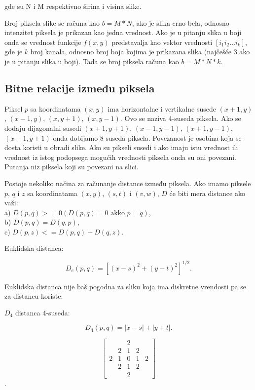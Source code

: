 \documentclass[a4paper,12pt,titlepage]{article}
\begin{document}
gde su N i M respektivno širina i visina slike.

Broj piksela slike se računa kao $b = M * N$, ako je slika crno bela, odnosno intenzitet piksela je prikazan kao jedna vrednost. Ako je u pitanju slika u boji onda se vrednost funkcije $f(x, y)$ predstavalja kao vektor vrednosti $[i_{1} i_{2} \dots i_{k}]$, gde je $k$ broj kanala, odnosno broj boja kojima je prikazana slika (najčešće 3 ako je u pitanju slika u boji). Tada se broj piksela računa kao $b = M * N * k$.

\subsection{Bitne relacije između piksela}%

Piksel $p$ sa koordinatama $(x, y)$ ima horizontalne i vertikalne susede $(x + 1, y)$, $(x - 1, y)$, $(x, y + 1)$, $(x, y - 1)$. Ovo se naziva 4-suseda piksela. Ako se dodaju dijagonalni susedi $(x + 1, y + 1)$, $(x - 1, y - 1)$, $(x + 1, y - 1)$, $(x - 1, y + 1)$ onda dobijamo 8-suseda piksela. Povezanost je osobina koja se dosta koristi u obradi slike. Ako su pikseli susedi i ako imaju istu vrednost ili vrednost iz istog podopsega mogućih vrednosti piksela onda su oni povezani. Putanja niz piksela koji su povezani na slici.

Postoje nekoliko načina za računanje distance između piksela. Ako imamo piksele $p$, $q$ i $z$ sa koordinatama $(x, y)$, $(s, t)$ i $(v, w)$, $D$ će biti mera distance ako važi:\\

\noindent
a) $D(p, q) >= 0 (D(p, q) = 0  \text{ akko } p = q)$,\\
b) $D(p, q) = D(q, p)$,\\
c) $D(p, z) <= D(p, q) + D(q, z)$.

Euklidska distanca: 

\begin{equation}\label{eq:euclid}
D_{e}(p, q) = [ (x  - s)^{2} + (y - t)^{2} ]^{1/2}.
\end{equation} 

Euklidska distanca nije baš pogodna za sliku koja ima diskretne vrendosti pa se za distancu koriste:

$D_{4}$ distanca 4-suseda:

\begin{equation}\label{eq:4ne}
D_{4}(p, q) = |x - s| + |y + t|.
\end{equation} 

\[
\begin{bmatrix}
     &  & 2 &   &  \\
     & 2 & 1 & 2  &  \\
     2 & 1 & 0 & 1 & 2 \\
     & 2 & 1 & 2  &  \\
     &  & 2 &   &  
\end{bmatrix}
\].
\end{document}
